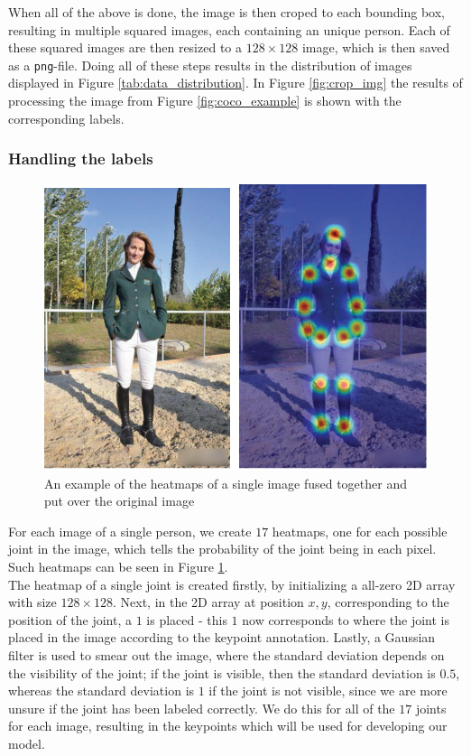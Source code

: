 \documentclass[main.tex]{subfiles}
\begin{document}
When all of the above is done, the image is then croped to each bounding box, resulting in multiple squared images, each containing an unique person. Each of these squared images are then resized to a $128 \times 128$ image, which is then saved as a \texttt{png}-file. Doing all of these steps results in the distribution of images displayed in Figure \ref{tab:data_distribution}. In Figure \ref{fig:crop_img} the results of processing the image from Figure \ref{fig:coco_example} is shown with the corresponding labels. 

\subsubsection{Handling the labels}
\begin{figure}[H]
    \centering
    \includegraphics[height = 4 cm]{../entities/heatmaps_ex.PNG}
    \caption{An example of the heatmaps of a single image fused together and put over the original image \cite{survey_1}}
    \label{fig:heatmaps_ex}
\end{figure}
For each image of a single person, we create $17$ heatmaps, one for each possible joint in the image, which tells the probability of the joint being in each pixel. Such heatmaps can be seen in Figure \ref{fig:heatmaps_ex}. \\
The heatmap of a single joint is created firstly, by initializing a all-zero 2D array with size $128 \times 128$. Next, in the 2D array at position $x, y$, corresponding to the position of the joint, a $1$ is placed - this $1$ now corresponds to where the joint is placed in the image according to the keypoint annotation. Lastly, a Gaussian filter is used to smear out the image, where the standard deviation depends on the visibility of the joint; if the joint is visible, then the standard deviation is $0.5$, whereas the standard deviation is $1$ if the joint is not visible, since we are more unsure if the joint has been labeled correctly. We do this for all of the $17$ joints for each image, resulting in the keypoints which will be used for developing our model.
\end{document}
